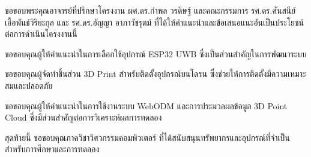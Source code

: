 %

\begin{acknowledgments}
ขอขอบพระคุณอาจารย์ที่ปรึกษาโครงงาน ผศ.ดร.กำพล วรดิษฐ์ และคณะกรรมการ รศ.ดร.ศันสนีย์ เอื้อพันธ์วิริยะกุล และ รศ.ดร.อัญญา อาภาวัชรุตม์ 
ที่ได้ให้คำแนะนำและข้อเสนอแนะอันเป็นประโยชน์ต่อการดำเนินโครงงานนี้ 

ขอขอบคุณผู้ให้คำแนะนำในการเลือกใช้อุปกรณ์ ESP32 UWB ซึ่งเป็นส่วนสำคัญในการพัฒนาระบบ

ขอขอบคุณผู้จัดทำชิ้นส่วน 3D Print สำหรับติดตั้งอุปกรณ์บนโดรน ซึ่งช่วยให้การติดตั้งมีความเหมาะสมและปลอดภัย

ขอขอบคุณผู้ให้คำแนะนำในการใช้งานระบบ WebODM และการประมวลผลข้อมูล 3D Point Cloud ซึ่งมีส่วนสำคัญต่อการวิเคราะห์ผลการทดลอง

สุดท้ายนี้ ขอขอบคุณภาควิชาวิศวกรรมคอมพิวเตอร์ ที่ได้สนับสนุนทรัพยากรและอุปกรณ์ที่จำเป็นสำหรับการศึกษาและการทดลอง
\end{acknowledgments}%
\fi %

\contentspage

\ifproject
\figurelistpage

\tablelistpage
\fi %



